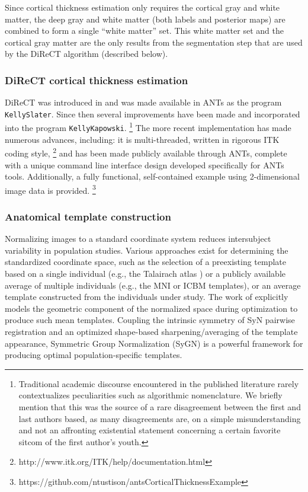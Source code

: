 Since cortical thickness estimation only requires the cortical gray
and white matter, the deep gray and white matter
(both labels and posterior maps) are combined to form a single
``white matter'' set.  This white matter set and the cortical
gray matter are the only results from the segmentation
step that are used by the DiReCT algorithm (described below).


\subsubsection{DiReCT cortical thickness estimation}

DiReCT was introduced 
in \cite{das2009} and was made available in ANTs as the program \verb#KellySlater#.
Since then several improvements have been made and incorporated into the program
\verb#KellyKapowski#.%
\footnote{
Traditional academic discourse encountered in the published literature
rarely contextualizes peculiarities such as algorithmic nomenclature.
We briefly mention that
this was the source of a rare disagreement between the first and last authors
based, as many disagreements are, on a simple misunderstanding and not an
affronting existential statement concerning a certain favorite sitcom
of the first author's youth. 
}
The more recent implementation has made numerous advances, including:
it is multi-threaded, written in rigorous ITK coding style,%
\footnote{
http://www.itk.org/ITK/help/documentation.html
}
 and
has been made publicly available through ANTs, complete with a unique command line
interface design developed specifically for ANTs tools.
Additionally, a fully functional, self-contained example using 2-dimensional image data is 
provided.%
\footnote{
https://github.com/ntustison/antsCorticalThicknessExample
}

\subsubsection{Anatomical template construction}

Normalizing images to a standard coordinate system
reduces intersubject variability in population studies.  Various
approaches exist for determining the standardized coordinate space,
such as the selection of a preexisting template based on a single individual
(e.g., the Talairach atlas \citep{Talairach1988}) or a publicly available average of multiple individuals
(e.g., the MNI \citep{Collins1994} or ICBM \citep{Mazziotta1995}
templates), or an average template constructed from the individuals under study.
The work of \cite{avants2010} explicitly models the geometric component of the 
normalized space during optimization to produce such mean templates.  Coupling the intrinsic symmetry of 
SyN pairwise registration \citep{avants2011} and an
optimized shape-based sharpening/averaging of the template appearance, Symmetric Group Normalization (SyGN) is a powerful framework for producing optimal population-specific templates.

